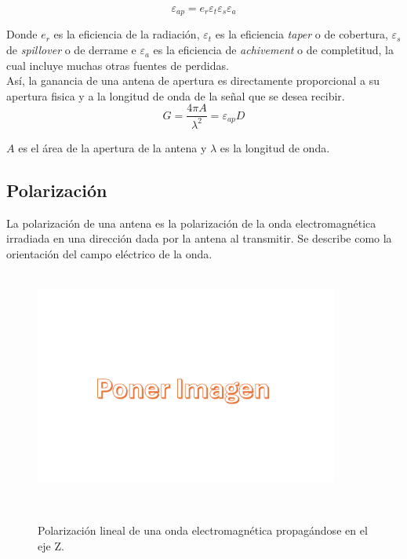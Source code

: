 \begin{equation}
    \varepsilon_{ap} = e_{r} \varepsilon_{t} \varepsilon_{s} \varepsilon_{a}
\end{equation}

Donde $e_{r}$ es la eficiencia de la radiación, $\varepsilon_{t}$ es la eficiencia \textit{taper} o de cobertura, $\varepsilon_{s}$ de \textit{spillover} o de derrame e $\varepsilon_{a}$ es la eficiencia de \textit{achivement} o de completitud, la cual incluye muchas otras fuentes de perdidas.\\

Así, la ganancia de una antena de apertura es directamente proporcional a su apertura fisica y a la longitud de onda de la señal que se desea recibir.\\

\begin{equation}
    G = \frac{4\pi A}{\lambda^{2}} = \varepsilon_{ap} D
\end{equation}

$A$ es el área de la apertura de la antena y $\lambda$ es la longitud de onda.\\

\subsection{Polarización}

La polarización de una antena es la polarización de la onda electromagnética irradiada en una dirección dada por la antena al transmitir. Se describe como la orientación del campo eléctrico de la onda.\\

\begin{figure}
    \centering
    \includegraphics[width = 10cm]{img/imagen.png}
    \caption{Polarización lineal de una onda electromagnética propagándose en el eje Z.}
    \label{fig:polarización}
\end{figure}

